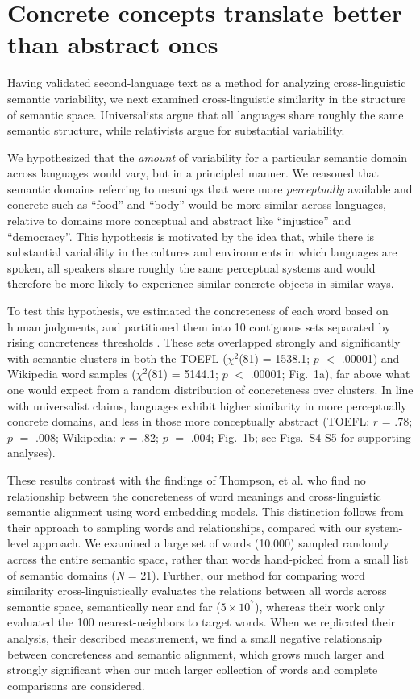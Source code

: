 \documentclass[9pt,twocolumn,twoside,lineno]{pnas-new}
\begin{document}
\section*{Concrete concepts translate better than abstract ones}
Having validated second-language text as a method for analyzing cross-linguistic semantic variability, we next examined cross-linguistic similarity in the structure of semantic space. Universalists argue that all languages share roughly the same semantic structure, while relativists argue for substantial variability.

We hypothesized that the {\it amount} of variability for a particular semantic domain across languages would vary, but in a principled manner. We reasoned that semantic domains referring to meanings that were more \textit{perceptually} available and concrete such as ``food'' and ``body'' would be more similar across languages, relative to domains more conceptual and abstract like ``injustice'' and ``democracy''. This hypothesis is motivated by the idea that, while there is substantial variability in the cultures and environments in which languages are spoken, all speakers share roughly the same perceptual systems and would therefore be more likely to experience similar concrete objects in similar ways.

To test this hypothesis, we estimated the concreteness of each word based on human judgments, and partitioned them into 10 contiguous sets separated by rising concreteness thresholds  \cite{brysbaert2014concreteness}. These sets overlapped strongly and significantly with semantic clusters in both the TOEFL ($\chi^2$(81) = 1538.1; $p$ $<$ .00001) and Wikipedia word samples ($\chi^2$(81) =  5144.1; $p$ $<$ .00001; Fig.\ 1a), far above what one would expect from a random distribution of concreteness over clusters. In line with universalist claims, languages exhibit higher similarity in more perceptually concrete domains, and less in those more conceptually abstract (TOEFL: $r$ = .78; $p$ $=$ .008; Wikipedia: $r$ = .82; $p$ $=$ .004; Fig.\ 1b; see  Figs.\ S4-S5 for supporting analyses).

These results contrast with the findings of Thompson, et al. \cite{thompson2020cultural} who find no relationship between the concreteness of word meanings and cross-linguistic semantic alignment using word embedding models. This distinction follows from their approach to sampling words and relationships, compared with our system-level approach. We examined a large set of words (10,000) sampled randomly across the entire semantic space, rather than words hand-picked from a small list of semantic domains ({\it N} = 21). Further, our method for comparing word similarity cross-linguistically evaluates the relations between all words across semantic space, semantically near and far ($5\times10^7$), whereas their work only evaluated the 100 nearest-neighbors to target words. When we replicated their analysis, their described measurement, we find a small negative relationship between concreteness and semantic alignment, which grows much larger and strongly significant when our much larger collection of words and complete comparisons are considered.   
\end{document}
